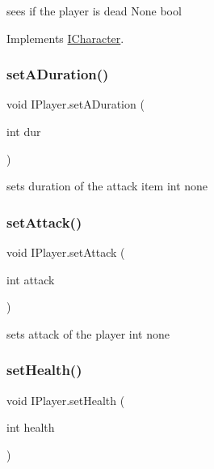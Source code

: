 sees if the player is dead  None  bool 

Implements \mbox{\hyperlink{interface_i_character}{I\+Character}}.

\mbox{\label{class_i_player_a3eaa74cff113c64a6cee96c9e0b3da5c}} 
\subsubsection{\texorpdfstring{set\+A\+Duration()}{setADuration()}}
{\footnotesize\ttfamily void I\+Player.\+set\+A\+Duration (\begin{DoxyParamCaption}\item[{int}]{dur }\end{DoxyParamCaption})\hspace{0.3cm}{\ttfamily [inline]}}

sets duration of the attack item  int  none \mbox{\label{class_i_player_ac5e448510f1d5c2b09ccd6e71aef57c8}} 
\subsubsection{\texorpdfstring{set\+Attack()}{setAttack()}}
{\footnotesize\ttfamily void I\+Player.\+set\+Attack (\begin{DoxyParamCaption}\item[{int}]{attack }\end{DoxyParamCaption})\hspace{0.3cm}{\ttfamily [inline]}}

sets attack of the player  int  none \mbox{\label{class_i_player_a30143696c1b07bf382b8dac33cb7e6c1}} 
\subsubsection{\texorpdfstring{set\+Health()}{setHealth()}}
{\footnotesize\ttfamily void I\+Player.\+set\+Health (\begin{DoxyParamCaption}\item[{int}]{health }\end{DoxyParamCaption})\hspace{0.3cm}{\ttfamily [inline]}}

